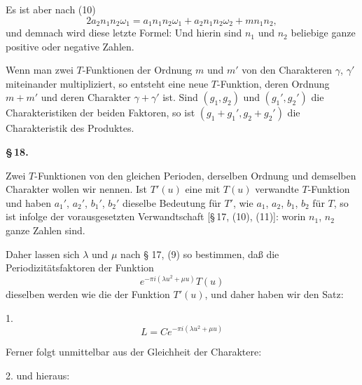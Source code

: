 Es ist aber nach (10)
\[
2a_2n_1n_2\omega_1 = a_1n_1n_2\omega_1 + a_2n_1n_2\omega_2 + mn_1n_2,
\]
und demnach wird diese letzte Formel:
Und hierin sind $n_1$ und $n_2$ beliebige ganze positive oder negative Zahlen.

Wenn man zwei $T$-Funktionen der Ordnung $m$ und $m'$ von den Charakteren $\gamma$, $\gamma'$ miteinander multipliziert, so entsteht eine neue $T$-Funktion, deren Ordnung $m+m'$ und deren Charakter $\gamma+\gamma'$ ist. Sind $(g_1, g_2)$ und $(g_1', g_2')$ die Charakteristiken der beiden Faktoren, so ist $(g_1+g_1', g_2+g_2')$ die Charakteristik des Produktes.

\begin{center}
\textbf{\S\,18. }
\end{center}

Zwei $T$-Funktionen von den gleichen Perioden, derselben Ordnung und demselben Charakter wollen wir  nennen. Ist $T'(u)$ eine mit $T(u)$ verwandte $T$-Funktion und haben $a_1'$, $a_2'$, $b_1'$, $b_2'$ dieselbe Bedeutung für $T'$, wie $a_1$, $a_2$, $b_1$, $b_2$ für $T$, so ist infolge der vorausgesetzten Verwandtschaft [§\,17, (10), (11)]:
worin $n_1$, $n_2$ ganze Zahlen sind.

Daher lassen sich $\lambda$ und $\mu$ nach § 17, (9) so bestimmen, daß die Periodizitätsfaktoren der Funktion
\[
e^{-\pi i(\lambda u^2+\mu u)}T(u)
\]
dieselben werden wie die der Funktion $T'(u)$, und daher haben wir den Satz:

1. 
\[
L = Ce^{-\pi i(\lambda u^2+\mu u)}
\]

Ferner folgt unmittelbar aus der Gleichheit der Charaktere:

2.  und hieraus:
